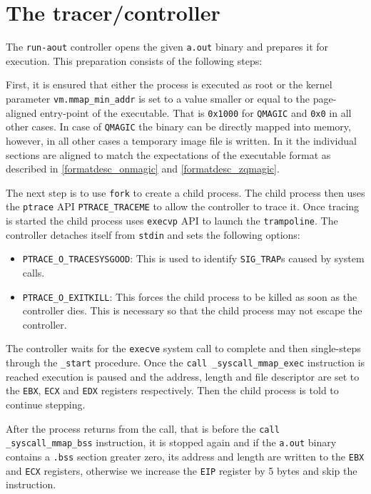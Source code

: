 \documentclass[draft,final]{vutinfth} %
\begin{document}
\section{The tracer/controller}
\label{solution_tracer}

The \texttt{run-aout} controller opens the given \texttt{a.out} binary and prepares it for execution. This preparation consists of the following steps:

First, it is ensured that either the process is executed as root or the kernel parameter \texttt{vm.mmap\_min\_addr} is set to a value smaller or equal to the page-aligned entry-point of the executable. That is \texttt{0x1000} for \texttt{QMAGIC} and \texttt{0x0} in all other cases. In case of \texttt{QMAGIC} the binary can be directly mapped into memory, however, in all other cases a temporary image file is written. In it the individual sections are aligned to match the expectations of the executable format as described in \ref{formatdesc_onmagic} and \ref{formatdesc_zqmagic}.

The next step is to use \texttt{fork} to create a child process. The child process then uses the \texttt{ptrace} API \texttt{PTRACE\_TRACEME} to allow the controller to trace it. Once tracing is started the child process uses \texttt{execvp} API to launch the \texttt{trampoline}. The controller detaches itself from \texttt{stdin} and sets the following options:

\begin{itemize}
    \item \texttt{PTRACE\_O\_TRACESYSGOOD}: This is used to identify \texttt{SIG\_TRAP}s caused by system calls.
    \item \texttt{PTRACE\_O\_EXITKILL}: This forces the child process to be killed as soon as the controller dies. This is necessary so that the child process may not escape the controller.
\end{itemize}

The controller waits for the \texttt{execve} system call to complete and then single-steps through the \texttt{\_start} procedure. Once the \texttt{call \_syscall\_mmap\_exec} instruction is reached execution is paused and the address, length and file descriptor are set to the \texttt{EBX}, \texttt{ECX} and \texttt{EDX} registers respectively. Then the child process is told to continue stepping.

After the process returns from the call, that is before the \texttt{call \_syscall\_mmap\_bss} instruction, it is stopped again and if the \texttt{a.out} binary contains a \texttt{.bss} section greater zero, its address and length are written to the \texttt{EBX} and \texttt{ECX} registers, otherwise we increase the \texttt{EIP} register by 5 bytes and skip the instruction.
\end{document}

